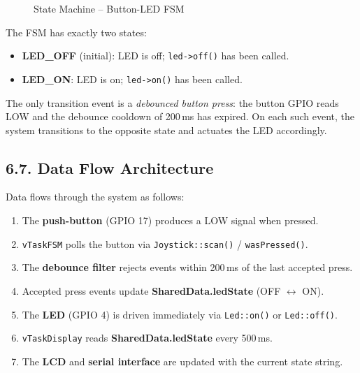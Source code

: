 \documentclass[12pt]{article}
\begin{document}
\begin{figure}[H]
    \centering
    \caption{State Machine – Button-LED FSM}
    \label{fig:state-machine}
\end{figure}

The FSM has exactly two states:
\begin{itemize}
    \item \textbf{LED\_OFF} (initial): LED is off; \texttt{led->off()} has been called.
    \item \textbf{LED\_ON}: LED is on; \texttt{led->on()} has been called.
\end{itemize}
The only transition event is a \emph{debounced button press}: the button GPIO reads LOW and the debounce cooldown of 200\,ms has expired. On each such event, the system transitions to the opposite state and actuates the LED accordingly.

\subsection*{6.7. Data Flow Architecture}

Data flows through the system as follows:

\begin{enumerate}
    \item The \textbf{push-button} (GPIO 17) produces a LOW signal when pressed.
    \item \texttt{vTaskFSM} polls the button via \texttt{Joystick::scan()} / \texttt{wasPressed()}.
    \item The \textbf{debounce filter} rejects events within 200\,ms of the last accepted press.
    \item Accepted press events update \textbf{SharedData.ledState} (OFF $\leftrightarrow$ ON).
    \item The \textbf{LED} (GPIO 4) is driven immediately via \texttt{Led::on()} or \texttt{Led::off()}.
    \item \texttt{vTaskDisplay} reads \textbf{SharedData.ledState} every 500\,ms.
    \item The \textbf{LCD} and \textbf{serial interface} are updated with the current state string.
\end{enumerate}
\end{document}
